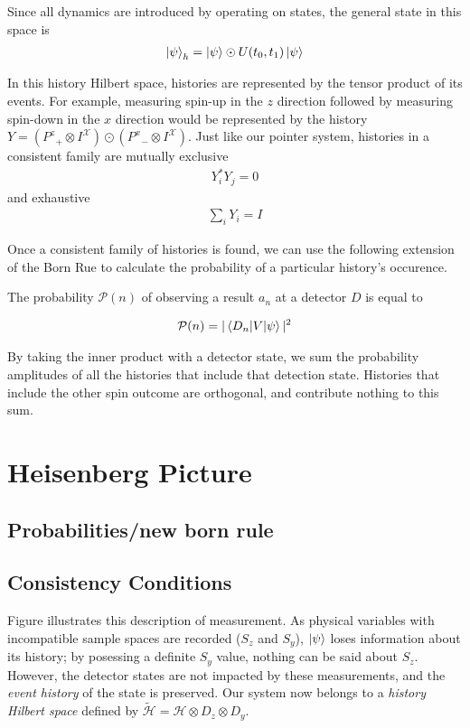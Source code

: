 Since all dynamics are introduced by operating on states, the general state in this space is
\begin{align}
  {\ket{\psi}}_h = \ket{\psi} \odot U(t_0, t_1)\ket{\psi}
\end{align}

In this history Hilbert space, histories are represented by the tensor product of its events. For example, measuring spin-up in the $z$ direction followed by measuring spin-down in the $x$ direction would be represented by the history $Y = \left({P^z}_+ \otimes {I^\mathcal{X}} \right) \odot \left({P^x}_- \otimes {I^\mathcal{X}} \right)$.
Just like our pointer system, histories in a consistent family are mutually exclusive
\begin{align}
  Y_i^* Y_j = 0
\end{align}
and exhaustive
\begin{align}
  \sum_{i} Y_i = I
\end{align}

Once a consistent family of histories is found, we can use the following extension of the Born Rue to calculate the probability of a particular history's occurence.

The probability $\mathcal{P}(n)$ of observing a result $a_n$ at a detector $D$ is equal to

\begin{align}
  \mathcal{P}(n) = |\braket{D_n|V|\psi}|^2
\end{align}

By taking the inner product with a detector state, we sum the probability amplitudes of all the histories that include that detection state. Histories that include the other spin outcome are orthogonal, and contribute nothing to this sum.

\section{Heisenberg Picture}
\subsection{Probabilities/new born rule}
\subsection{Consistency Conditions}

Figure  illustrates this description of measurement. As physical variables with incompatible sample spaces are recorded ($S_z$ and $S_y$), $\ket{\psi}$ loses information about its history; by posessing a definite $S_y$ value, nothing can be said about $S_z$. However, the detector states are not impacted by these measurements, and the \textit{event history} of the state is preserved. Our system now belongs to a \textit{history Hilbert space} defined by $\widetilde{\mathcal{H}} = \mathcal{H} \otimes D_z \otimes D_y$.

